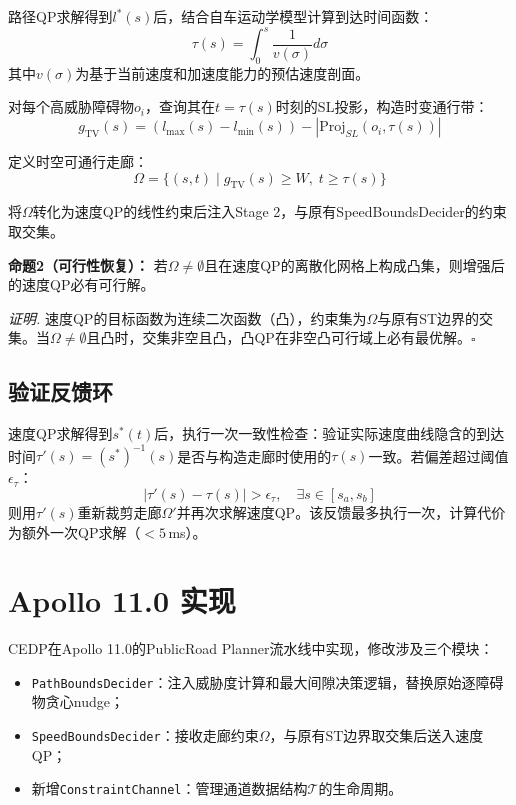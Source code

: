 \documentclass[a4paper,11pt]{article}
\begin{document}
路径QP求解得到$l^*(s)$后，结合自车运动学模型计算到达时间函数：
\begin{equation}
  \tau(s) = \int_0^s \frac{1}{v(\sigma)} d\sigma
\end{equation}
其中$v(\sigma)$为基于当前速度和加速度能力的预估速度剖面。

对每个高威胁障碍物$o_i$，查询其在$t = \tau(s)$时刻的SL投影，构造时变通行带：
\begin{equation}
  g_{\text{TV}}(s) = (l_{\max}(s) - l_{\min}(s)) - |\text{Proj}_{SL}(o_i, \tau(s))|
\end{equation}

定义时空可通行走廊：
\begin{equation}
  \Omega = \{(s, t) \mid g_{\text{TV}}(s) \geq W,\; t \geq \tau(s)\}
\end{equation}

将$\Omega$转化为速度QP的线性约束后注入Stage 2，与原有SpeedBoundsDecider的约束取交集。

\textbf{命题2（可行性恢复）：} 若$\Omega \neq \emptyset$且在速度QP的离散化网格上构成凸集，则增强后的速度QP必有可行解。

\textit{证明.} 速度QP的目标函数为连续二次函数（凸），约束集为$\Omega$与原有ST边界的交集。当$\Omega \neq \emptyset$且凸时，交集非空且凸，凸QP在非空凸可行域上必有最优解。\hfill$\square$

\subsection{验证反馈环}

速度QP求解得到$s^*(t)$后，执行一次一致性检查：验证实际速度曲线隐含的到达时间$\tau'(s) = (s^*)^{-1}(s)$是否与构造走廊时使用的$\tau(s)$一致。若偏差超过阈值$\epsilon_\tau$：
\begin{equation}
  |\tau'(s) - \tau(s)| > \epsilon_\tau, \quad \exists s \in [s_a, s_b]
\end{equation}
则用$\tau'(s)$重新裁剪走廊$\Omega'$并再次求解速度QP。该反馈最多执行一次，计算代价为额外一次QP求解（$< 5$\,ms）。

\section{Apollo 11.0 实现}

CEDP在Apollo 11.0的PublicRoad Planner流水线中实现，修改涉及三个模块：

\begin{itemize}
  \item \texttt{PathBoundsDecider}：注入威胁度计算和最大间隙决策逻辑，替换原始逐障碍物贪心nudge；
  \item \texttt{SpeedBoundsDecider}：接收走廊约束$\Omega$，与原有ST边界取交集后送入速度QP；
  \item 新增\texttt{ConstraintChannel}：管理通道数据结构$\mathcal{T}$的生命周期。
\end{itemize}
\end{document}
